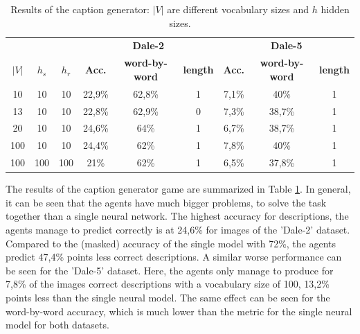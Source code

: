 \begin{table}[ht]
    \centering
    \begin{tabular}{ccc|ccc|ccc}
        \toprule
              &         &         & \multicolumn{3}{c}{\textbf{Dale-2}} & \multicolumn{3}{c}{\textbf{Dale-5}}                                                                             \\\cmidrule(lr){4-6}\cmidrule(lr){7-9}
        $|V|$ & $h_{s}$ & $h_{r}$ & \textbf{Acc.}                       & \textbf{word-by-word}               & \textbf{length} & \textbf{Acc.} & \textbf{word-by-word} & \textbf{length} \\\midrule
        {10}  & {10}    & {10}    & {22,9\%}                            & {62,8\%}                            & {1}             & {7,1\%}       & {40\%}                & {1}             \\
        {13}  & {10}    & {10}    & {22,8\%}                            & {62,9\%}                            & {0}             & {7,3\%}       & {38,7\%}              & {1}             \\
        {20}  & {10}    & {10}    & {24,6\%}                            & {64\%}                              & {1}             & {6,7\%}       & {38,7\%}              & {1}             \\
        {100} & {10}    & {10}    & {24,4\%}                            & {62\%}                              & {1}             & {7,8\%}       & {40\%}                & {1}             \\
        {100} & {100}   & {100}   & {21\%}                              & {62\%}                              & {1}             & {6,5\%}       & {37,8\%}              & {1}             \\
        \bottomrule
    \end{tabular}
    \caption{Results of the caption generator: $|V|$ are different vocabulary sizes and $h$ hidden sizes.}
    \label{tab:results_caption_generator_game}
\end{table}

The results of the caption generator game are summarized in Table \ref{tab:results_caption_generator_game}.
In general, it can be seen that the agents have much bigger problems, to solve the task together than a single neural network.
The highest accuracy for descriptions, the agents manage to predict correctly is at 24,6\% for images of the 'Dale-2' dataset.
Compared to the (masked) accuracy of the single model with 72\%, the agents predict 47,4\% points less correct descriptions.
A similar worse performance can be seen for the 'Dale-5' dataset.
Here, the agents only manage to produce for 7,8\% of the images correct descriptions with a vocabulary size of 100, 13,2\% points less than the single neural model.
The same effect can be seen for the word-by-word accuracy, which is much lower than the metric for the single neural model for both datasets.


